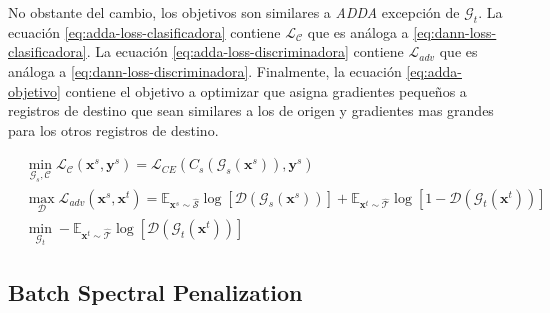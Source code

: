 No obstante del cambio, los objetivos son similares a {\it ADDA} excepci\'on de $\mathcal{G}_t$. La ecuaci\'on
\ref{eq:adda-loss-clasificadora} contiene $\mathcal{L}_\mathcal{C}$ que es an\'aloga a
\ref{eq:dann-loss-clasificadora}. La ecuaci\'on \ref{eq:adda-loss-discriminadora} contiene $\mathcal{L}_{adv}$ que es
an\'aloga a \ref{eq:dann-loss-discriminadora}. Finalmente, la ecuaci\'on \ref{eq:adda-objetivo} contiene el objetivo a
optimizar que asigna gradientes peque\~{n}os a registros de destino que sean similares a los de origen y gradientes mas
grandes para los otros registros de destino.

\begin{align}
     & \min_{\mathcal{G}_s, \mathcal{C}} \mathcal{L}_\mathcal{C}(\mathbf{x}^s, \mathbf{y}^s)                                                            = \mathcal{L}_{CE}(C_s(\mathcal{G}_s(\mathbf{x}^s)), \mathbf{y}^s)
    \label{eq:adda-loss-clasificadora}                                                                                                                                                                                                                                                                                                                                                          \\
     & \max_{\mathcal{D}} \mathcal{L}_{adv}(\mathbf{x}^s, \mathbf{x}^t)                                                                                 = \mathbb{E}_{\mathbf{x}^s \sim \mathcal{\hat{S}}}\log[\mathcal{D}(\mathcal{G}_s(\mathbf{x}^s))] + \mathbb{E}_{\mathbf{x}^t \sim \mathcal{\hat{T}}}\log[1-\mathcal{D}(\mathcal{G}_t(\mathbf{x}^t))] \label{eq:adda-loss-discriminadora} \\
     & \min_{\mathcal{G}_t} - \mathbb{E}_{\mathbf{x}^t \sim \mathcal{\hat{T}}} \log[\mathcal{D}(\mathcal{G}_t(\mathbf{x}^t))]  \label{eq:adda-objetivo}
\end{align}

\subsection{Batch Spectral Penalization}


